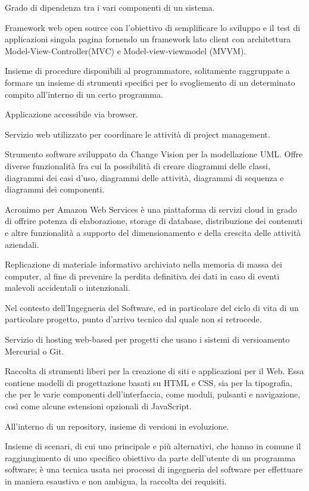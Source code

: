 \item[accoppiamento] Grado di dipendenza tra i vari componenti di un sistema.
\item[Angular.js] Framework web open source con l'obiettivo di semplificare lo sviluppo e il test di applicazioni singola pagina fornendo un framework lato client con architettura Model-View-Controller(MVC) e Model-view-viewmodel (MVVM).
\item[API] Insieme di procedure disponibili al programmatore, solitamente raggruppate a formare un insieme di strumenti specifici per lo svogliemento di un determinato compito all'interno di un certo programma.
\item[applicazione web] Applicazione accessibile via browser.
\item[Asana] Servizio web utilizzato per coordinare le attività di project management.
\item[Astah] Strumento software sviluppato da Change Vision per la modellazione UML. Offre diverse funzionalità fra cui la possibilità di creare diagrammi delle classi, diagrammi dei casi d’uso, diagrammi delle attività, diagrammi di sequenza e diagrammi dei componenti.
\item[AWS] Acronimo per Amazon Web Services è una piattaforma di servizi cloud in grado di offrire potenza di elaborazione, storage di database, distribuzione dei contenuti e altre funzionalità a supporto del dimensionamento e della crescita delle attività aziendali.
\item[backup] Replicazione di materiale informativo archiviato nella memoria di massa dei computer, al fine di prevenire la perdita definitiva dei dati in caso di eventi malevoli accidentali o intenzionali.
\item[baseline] Nel contesto dell'Ingegneria del Software, ed in particolare del ciclo di vita di un particolare progetto, punto d'arrivo tecnico dal quale non si retrocede.
\item[Bitbucket] Servizio di hosting web-based per progetti che usano i sistemi di versioamento Mercurial o Git.
\item[Bootstrap] Raccolta di strumenti liberi per la creazione di siti e applicazioni per il Web. Essa contiene modelli di progettazione basati su HTML e CSS, sia per la tipografia, che per le varie componenti dell'interfaccia, come moduli, pulsanti e navigazione, così come alcune estensioni opzionali di JavaScript.
\item[branch] All'interno di un repository, insieme di versioni in evoluzione.
\item[caso d'uso] Insieme di scenari, di cui uno principale e più alternativi, che hanno in comune il raggiungimento di uno specifico obiettivo da parte dell'utente di un programma software; è una tecnica usata nei processi di ingegneria del software per effettuare in maniera esaustiva e non ambigua, la raccolta dei requisiti.
